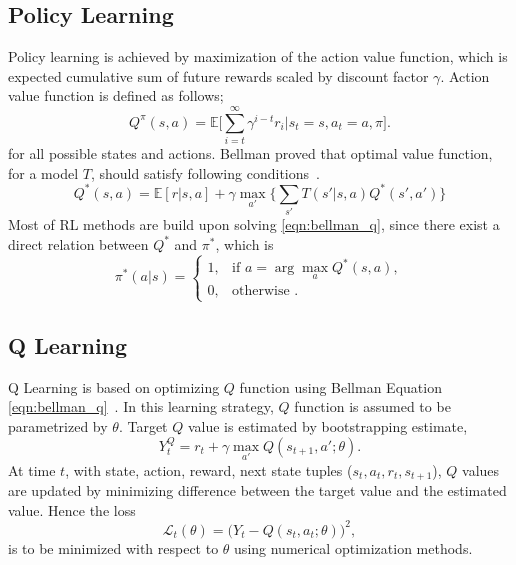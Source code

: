 \documentclass[a4paper, 12pt]{article} %
\begin{document}
\subsection{Policy Learning}

Policy learning is achieved by maximization of the action value function, which is expected cumulative sum of future rewards scaled by discount factor $\gamma$. Action value function is defined as follows;
\begin{equation}
Q^{\pi}(s,a) = \mathbb{E}\bigg[\sum_{i=t}^{\infty} \gamma^{i-t} r_i|s_t=s, a_t=a, \pi\bigg]. %
\end{equation}
for all possible states and actions. 
Bellman proved that optimal value function, for a model $T$, should satisfy following conditions~\cite{bellman_dynamic_2003}. 
\begin{equation}
\label{eqn:bellman_q}
Q^{*}(s,a) = \mathbb{E}[r|s,a] + \gamma \max_{a'} \Big\{ \sum_{s'} T(s'|s,a) Q^{*}(s',a') \Big\}
\end{equation}
Most of RL methods are build upon solving \eqref{eqn:bellman_q}, since there exist a direct relation between $Q^*$ and $\pi^*$, which is 
\begin{equation}
\label{eqn:policy_stochastic_q}
\pi^{*}(a|s) = 
\begin{cases}
1,   & \text{if  } a = \arg\max_{a} Q^{*}(s,a), \\
0,   & \text{otherwise  }.
\end{cases} 
\end{equation}

\subsection{Q Learning}
Q Learning is based on optimizing $Q$ function using Bellman Equation \eqref{eqn:bellman_q}~\cite{watkins_technical_1992}. 
In this learning strategy, $Q$ function is assumed to be parametrized by $\theta$. 
Target $Q$ value is estimated by bootstrapping estimate, 
\begin{equation}
\label{eqn:q_target}
Y_t^Q = r_t + \gamma \max_{a'} Q(s_{t+1},a';\theta).
\end{equation}
At time $t$,  with state, action, reward, next state tuples ($s_t,a_t,r_t,s_{t+1}$), 
$Q$ values are updated by minimizing difference between the target value and the estimated value. 
Hence the loss 
\begin{equation}
\label{eqn:q_loss}
\mathcal{L}_t(\theta) = \big( Y_t - Q(s_t,a_t;\theta) \big) ^ 2, 
\end{equation}
is to be minimized with respect to $\theta$ using numerical optimization methods. 
\end{document}

